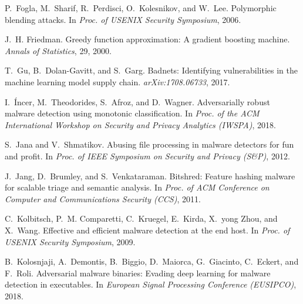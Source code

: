 \documentclass[conference]{IEEEtran}
\begin{document}
{\begin{thebibliography}{47}
	P.~Fogla, M.~Sharif, R.~Perdisci, O.~Kolesnikov, and W.~Lee.
	\newblock Polymorphic blending attacks.
	\newblock In \emph{Proc. of {USENIX} Security Symposium}, 2006.
	
	J.~H. Friedman.
	\newblock Greedy function approximation: A gradient boosting 
	machine.
	\newblock \emph{Annals of Statistics}, 29, 2000.
	
	T.~Gu, B.~Dolan{-}Gavitt, and S.~Garg.
	\newblock Badnets: Identifying vulnerabilities in the machine 
	learning model
	supply chain.
	\newblock \emph{arXiv:1708.06733}, 2017.
	
	I.~\'{I}ncer, M.~Theodorides, S.~Afroz, and D.~Wagner.
	\newblock Adversarially robust malware detection using monotonic
	classification.
	\newblock In \emph{Proc. of the {ACM} International Workshop on 
	Security and
		Privacy Analytics ({IWSPA})}, 2018.
	
	S.~{Jana} and V.~{Shmatikov}.
	\newblock Abusing file processing in malware detectors for fun and 
	profit.
	\newblock In \emph{Proc. of {IEEE} Symposium on Security and 
	Privacy ({S\&P})},
	2012.
	
	J.~Jang, D.~Brumley, and S.~Venkataraman.
	\newblock Bitshred: Feature hashing malware for scalable triage and 
	semantic
	analysis.
	\newblock In \emph{Proc. of {ACM} Conference on Computer and 
	Communications
		Security ({CCS})}, 2011.
	
	C.~Kolbitsch, P.~M. Comparetti, C.~Kruegel, E.~Kirda, X.~yong Zhou, 
	and
	X.~Wang.
	\newblock Effective and efficient malware detection at the end host.
	\newblock In \emph{Proc. of {USENIX} Security Symposium}, 2009.
	
	B.~Kolosnjaji, A.~Demontis, B.~Biggio, D.~Maiorca, G.~Giacinto, 
	C.~Eckert, and
	F.~Roli.
	\newblock Adversarial malware binaries: Evading deep learning for 
	malware
	detection in executables.
	\newblock In \emph{European Signal Processing Conference 
	({EUSIPCO})}, 2018.
	

\end{thebibliography}}
\end{document}
